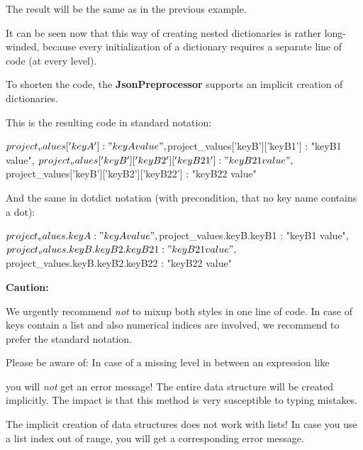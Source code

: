 The result will be the same as in the previous example.

It can be seen now that this way of creating nested dictionaries is rather long-winded, because every initialization of a dictionary
requires a separate line of code (at every level).

To shorten the code, the \textbf{JsonPreprocessor} supports an implicit creation of dictionaries.

This is the resulting code in standard notation:

\begin{pythoncode}
{
   ${project_values}['keyA'] : "keyA value",
   ${project_values}['keyB']['keyB1'] : "keyB1 value",
   ${project_values}['keyB']['keyB2']['keyB21'] : "keyB21 value",
   ${project_values}['keyB']['keyB2']['keyB22'] : "keyB22 value"
}
\end{pythoncode}

\vspace{2ex}

And the same in dotdict notation (with precondition, that no key name contains a dot):

\begin{pythoncode}
{
   ${project_values.keyA} : "keyA value",
   ${project_values.keyB.keyB1} : "keyB1 value",
   ${project_values.keyB.keyB2.keyB21} : "keyB21 value",
   ${project_values.keyB.keyB2.keyB22} : "keyB22 value"
}
\end{pythoncode}

\vspace{2ex}

\textbf{Caution:}

We urgently recommend \textit{not} to mixup both styles in one line of code. In case of keys contain a list and also numerical indices are involved,
we recommend to prefer the standard notation. 

Please be aware of: In case of a missing level in between an expression like 


you will \textit{not} get an error message! The entire data structure will be created implicitly. The impact is that this method
is very susceptible to typing mistakes.

The implicit creation of data structures does not work with lists! In case you use a list index out of range, you will get
a corresponding error message.


